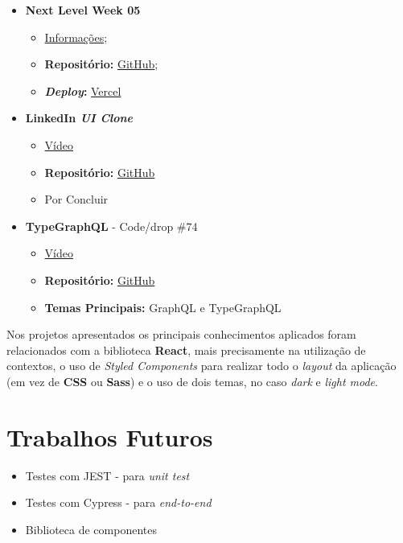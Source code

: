 \begin{minipage}[Ht]{0.45\textwidth}
	\begin{itemize}
		\item \textbf{Next Level Week 05}
			\begin{itemize}
				\item \href{http://nextlevelweek.com/}{Informações};
				\item \textbf{Repositório:} \href{https://github.com/TutoDS/nlw05-react}{GitHub};
				\item \textbf{\textit{Deploy}:} \href{https://podcastr-tutods.vercel.app/}{Vercel}
			\end{itemize}

		\item \textbf{LinkedIn \textit{UI Clone}}
			\begin{itemize}
				\item \href{https://www.youtube.com/watch?v=xP3cxbDUtrc}{Vídeo}
				\item \textbf{Repositório:} \href{https://github.com/TutoDS/reactjs-linkedin-clone}{GitHub}
				\item Por Concluir
			\end{itemize}

		\item \textbf{TypeGraphQL} - Code/drop \#74
			\begin{itemize}
				\item \href{https://www.youtube.com/watch?v=qMc5A5-Ktuw}{Vídeo}
				\item \textbf{Repositório:} \href{https://github.com/TutoDS/typegraphql-code-drops-74}{GitHub}
				\item \textbf{Temas Principais:} GraphQL e TypeGraphQL
			\end{itemize}
	\end{itemize}
\end{minipage}

\vspace{10pt}

Nos projetos apresentados os principais conhecimentos aplicados foram relacionados com a biblioteca \textbf{React}, mais precisamente na utilização de contextos, o uso de \textit{Styled Components} para realizar todo o \textit{layout} da aplicação (em vez de \textbf{CSS} ou \textbf{Sass}) e o uso de dois temas, no caso \textit{dark} e \textit{light mode}.

\section{Trabalhos Futuros}

\begin{itemize}
	\item Testes com JEST - para \textit{unit test}
	\item Testes com Cypress - para \textit{end-to-end}
	\item Biblioteca de componentes
\end{itemize}